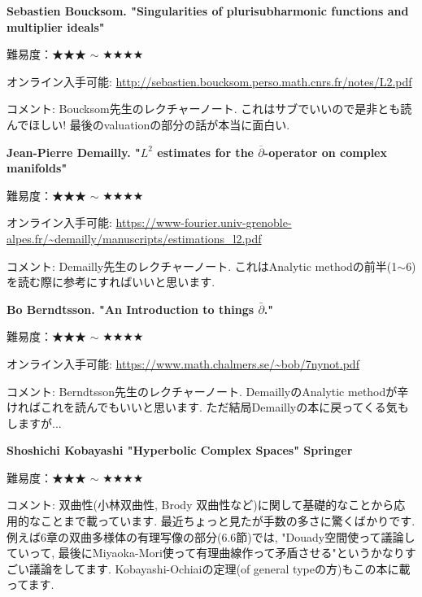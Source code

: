\textbf{Sebastien Boucksom. "Singularities of plurisubharmonic functions and multiplier ideals"}  　\vspace{-6pt} 

難易度：★★★ $\sim$ ★★★★  　\vspace{-6pt} 

オンライン入手可能: \url{http://sebastien.boucksom.perso.math.cnrs.fr/notes/L2.pdf}\vspace{-6pt}

コメント: Boucksom先生のレクチャーノート. これはサブでいいので是非とも読んでほしい! 最後のvaluationの部分の話が本当に面白い. 
\vspace{8pt}

\textbf{Jean-Pierre Demailly. "$L^2$ estimates for the $\overline{\partial}$-operator on complex manifolds"}  　\vspace{-6pt} 

難易度：★★★ $\sim$ ★★★★  　\vspace{-6pt} 

オンライン入手可能: \url{https://www-fourier.univ-grenoble-alpes.fr/~demailly/manuscripts/estimations_l2.pdf}\vspace{-6pt}

コメント: Demailly先生のレクチャーノート. これはAnalytic methodの前半(1$\sim$6)を読む際に参考にすればいいと思います. 
\vspace{8pt}

\textbf{Bo Berndtsson. "An Introduction to things $\bar\partial$."}  　\vspace{-6pt} 

難易度：★★★ $\sim$ ★★★★  　\vspace{-6pt} 

オンライン入手可能: \url{https://www.math.chalmers.se/~bob/7nynot.pdf}\vspace{-6pt}

コメント: Berndtsson先生のレクチャーノート. DemaillyのAnalytic methodが辛ければこれを読んでもいいと思います. ただ結局Demaillyの本に戻ってくる気もしますが...
\vspace{8pt}

\textbf{Shoshichi Kobayashi "Hyperbolic Complex Spaces" Springer}  　\vspace{-6pt} 

難易度：★★★ $\sim$ ★★★★  　\vspace{-6pt} 

コメント: 双曲性(小林双曲性, Brody 双曲性など)に関して基礎的なことから応用的なことまで載っています. 最近ちょっと見たが手数の多さに驚くばかりです. 例えば6章の双曲多様体の有理写像の部分(6.6節)では, "Douady空間使って議論していって, 最後にMiyaoka-Mori使って有理曲線作って矛盾させる"というかなりすごい議論をしてます. Kobayashi-Ochiaiの定理(of general typeの方)もこの本に載ってます.  

